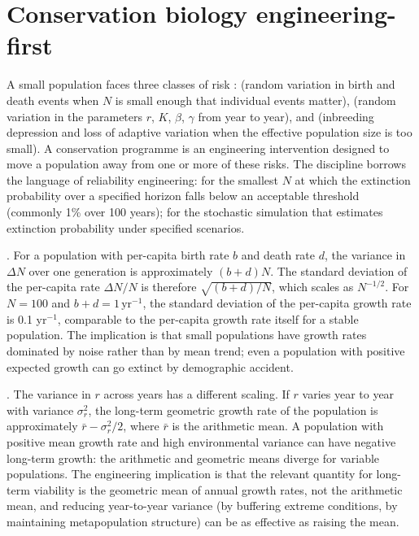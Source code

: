 \section{Conservation biology engineering-first}

A small population faces three classes of risk \cite[ch.~3]{text:v6c08-caughley-conservation}:
 (random variation in birth and
death events when $N$ is small enough that individual events matter),
 (random variation in the
parameters $r$, $K$, $\beta$, $\gamma$ from year to year), and
 (inbreeding depression and loss of
adaptive variation when the effective population size is too small).
A conservation programme is an engineering intervention designed to
move a population away from one or more of these risks. The
discipline borrows the language of reliability engineering:
 for the smallest $N$ at which
the extinction probability over a specified horizon falls below an
acceptable threshold (commonly 1\% over 100 years);  for the stochastic simulation that estimates
extinction probability under specified scenarios.

. For a population with per-capita
birth rate $b$ and death rate $d$, the variance in $\Delta N$ over
one generation is approximately $(b + d) N$. The standard deviation
of the per-capita rate $\Delta N / N$ is therefore $\sqrt{(b + d)/N}$,
which scales as $N^{-1/2}$. For $N = 100$ and $b + d = 1\,
\text{yr}^{-1}$, the standard deviation of the per-capita growth
rate is 0.1 yr$^{-1}$, comparable to the per-capita growth rate
itself for a stable population. The implication is that small
populations have growth rates dominated by noise rather than by
mean trend; even a population with positive expected growth can go
extinct by demographic accident.

. The variance in $r$ across
years has a different scaling. If $r$ varies year to year with
variance $\sigma_r^2$, the long-term geometric growth rate of the
population is approximately $\bar r - \sigma_r^2/2$, where $\bar r$ is
the arithmetic mean. A population with positive mean growth rate and
high environmental variance can have negative long-term growth: the
arithmetic and geometric means diverge for variable populations. The
engineering implication is that the relevant quantity for long-term
viability is the geometric mean of annual growth rates, not the
arithmetic mean, and reducing year-to-year variance (by buffering
extreme conditions, by maintaining metapopulation structure) can be
as effective as raising the mean.

